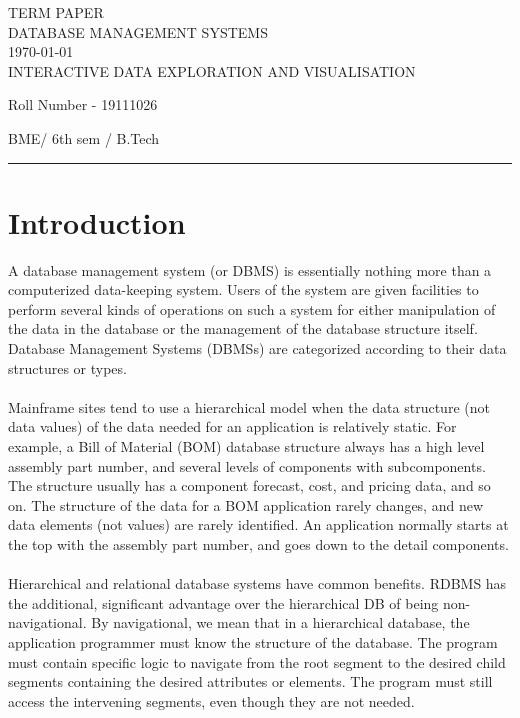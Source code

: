 \documentclass[12pt,letterpaper, onecolumn]{exam}
\begin{document}
\begingroup  
    \centering
    \LARGE TERM PAPER\\
    \LARGE DATABASE MANAGEMENT SYSTEMS\\[0.5em]
    \large \today\\[0.5em]
    \large INTERACTIVE DATA EXPLORATION AND VISUALISATION\par
    \large Roll Number - 19111026\par
    \large BME/ 6th sem / B.Tech\par
\endgroup
\rule{\textwidth}{0.4pt}
\pointsdroppedatright   %
\printanswers
\renewcommand{\solutiontitle}{\noindent\textbf{Ans:}\enspace}   %


    \section{Introduction}
    A database management system (or DBMS) is essentially nothing more than a computerized data-keeping system. Users of the system are given facilities to perform several kinds of operations on such a system for either manipulation of the data in the database or the management of the database structure itself. Database Management Systems (DBMSs) are categorized according to their data structures or types.
    \\\\
    Mainframe sites tend to use a hierarchical model when the data structure (not data values) of the data needed for an application is relatively static. For example, a Bill of Material (BOM) database structure always has a high level assembly part number, and several levels of components with subcomponents. The structure usually has a component forecast, cost, and pricing data, and so on. The structure of the data for a BOM application rarely changes, and new data elements (not values) are rarely identified. An application normally starts at the top with the assembly part number, and goes down to the detail components.
    \\\\
    Hierarchical and relational database systems have common benefits. RDBMS has the additional, significant advantage over the hierarchical DB of being non-navigational. By navigational, we mean that in a hierarchical database, the application programmer must know the structure of the database. The program must contain specific logic to navigate from the root segment to the desired child segments containing the desired attributes or elements. The program must still access the intervening segments, even though they are not needed.
    
\end{document}
